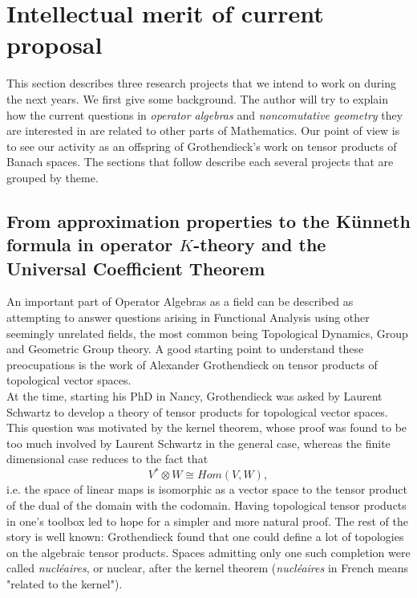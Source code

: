 \section{Intellectual merit of current proposal}

This section describes three research projects that we intend to work on during the next years. We first give some background. The author will try to explain how the current questions in \textit{operator algebras} and \textit{noncomutative geometry} they are interested in are related to other parts of Mathematics. Our point of view is to see our activity as an offspring of Grothendieck's work on tensor products of Banach spaces. The sections that follow describe each several projects that are grouped by theme.   

\subsection{From approximation properties to the K\"unneth formula in operator $K$-theory and the Universal Coefficient Theorem}

An important part of Operator Algebras as a field can be described as attempting to answer questions arising in Functional Analysis using other seemingly unrelated fields, the most common being Topological Dynamics, Group and Geometric Group theory. A good starting point to understand these preocupations is the work of Alexander Grothendieck on tensor products of topological vector spaces. \\

At the time, starting his PhD in Nancy, Grothendieck was asked by Laurent Schwartz to develop a theory of tensor products for topological vector spaces. This question was motivated by the kernel theorem, whose proof was found to be too much involved by Laurent Schwartz in the general case, whereas the finite dimensional case reduces to the fact that 
\[V^*\otimes W \cong Hom(V,W),\] 
i.e. the space of linear maps is isomorphic as a vector space to the tensor product of the dual of the domain with the codomain. Having topological tensor products in one's toolbox led to hope for a simpler and more natural proof. The rest of the story is well known: Grothendieck found that one could define a lot of topologies on the algebraic tensor products. Spaces admitting only one such completion were called \textit{nucl\'eaires}, or nuclear, after the kernel theorem (\textit{nucl\'eaires} in French means "related to the kernel").\\

